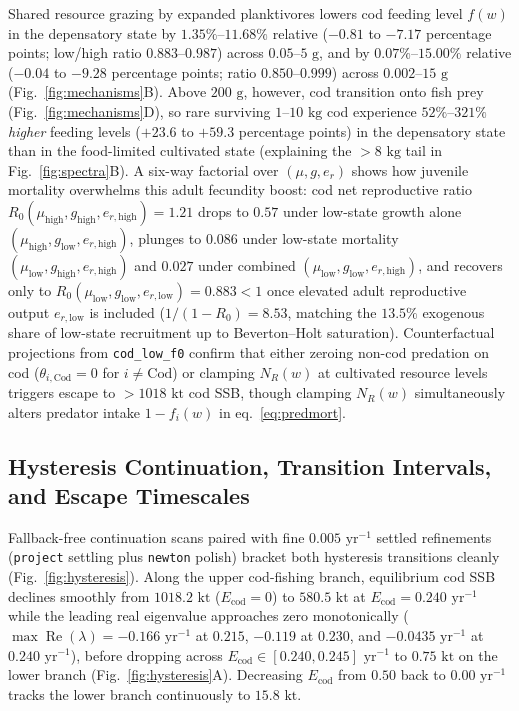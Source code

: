 \documentclass[11pt,letterpaper]{article}
\begin{document}
Shared resource grazing by expanded planktivores lowers cod feeding level $f(w)$ in the depensatory state by $1.35\%$--$11.68\%$ relative ($-0.81$ to $-7.17$ percentage points; low/high ratio $0.883$--$0.987$) across $0.05$--$5\text{ g}$, and by $0.07\%$--$15.00\%$ relative ($-0.04$ to $-9.28$ percentage points; ratio $0.850$--$0.999$) across $0.002$--$15\text{ g}$ (Fig.~\ref{fig:mechanisms}B). Above $200\text{ g}$, however, cod transition onto fish prey (Fig.~\ref{fig:mechanisms}D), so rare surviving $1$--$10\text{ kg}$ cod experience $52\%$--$321\%$ \emph{higher} feeding levels ($+23.6$ to $+59.3$ percentage points) in the depensatory state than in the food-limited cultivated state (explaining the $>8\text{ kg}$ tail in Fig.~\ref{fig:spectra}B). A six-way factorial over $(\mu, g, e_r)$ shows how juvenile mortality overwhelms this adult fecundity boost: cod net reproductive ratio $R_0(\mu_{\mathrm{high}}, g_{\mathrm{high}}, e_{r,\mathrm{high}}) = 1.21$ drops to $0.57$ under low-state growth alone $(\mu_{\mathrm{high}}, g_{\mathrm{low}}, e_{r,\mathrm{high}})$, plunges to $0.086$ under low-state mortality $(\mu_{\mathrm{low}}, g_{\mathrm{high}}, e_{r,\mathrm{high}})$ and $0.027$ under combined $(\mu_{\mathrm{low}}, g_{\mathrm{low}}, e_{r,\mathrm{high}})$, and recovers only to $R_0(\mu_{\mathrm{low}}, g_{\mathrm{low}}, e_{r,\mathrm{low}}) = 0.883 < 1$ once elevated adult reproductive output $e_{r,\mathrm{low}}$ is included ($1/(1 - R_0) = 8.53$, matching the $13.5\%$ exogenous share of low-state recruitment up to Beverton--Holt saturation). Counterfactual projections from \texttt{cod\_low\_f0} confirm that either zeroing non-cod predation on cod ($\theta_{i,\mathrm{Cod}} = 0$ for $i \neq \mathrm{Cod}$) or clamping $N_R(w)$ at cultivated resource levels triggers escape to $> 1018\text{ kt}$ cod SSB, though clamping $N_R(w)$ simultaneously alters predator intake $1 - f_i(w)$ in eq.~\eqref{eq:predmort}.

\subsection{Hysteresis Continuation, Transition Intervals, and Escape Timescales}

Fallback-free continuation scans paired with fine $0.005\text{ yr}^{-1}$ settled refinements (\texttt{project} settling plus \texttt{newton} polish) bracket both hysteresis transitions cleanly (Fig.~\ref{fig:hysteresis}). Along the upper cod-fishing branch, equilibrium cod SSB declines smoothly from $1018.2\text{ kt}$ ($E_{\mathrm{cod}} = 0$) to $580.5\text{ kt}$ at $E_{\mathrm{cod}} = 0.240\text{ yr}^{-1}$ while the leading real eigenvalue approaches zero monotonically ($\max\operatorname{Re}(\lambda) = -0.166\text{ yr}^{-1}$ at $0.215$, $-0.119$ at $0.230$, and $-0.0435\text{ yr}^{-1}$ at $0.240\text{ yr}^{-1}$), before dropping across $E_{\mathrm{cod}} \in [0.240, 0.245]\text{ yr}^{-1}$ to $0.75\text{ kt}$ on the lower branch (Fig.~\ref{fig:hysteresis}A). Decreasing $E_{\mathrm{cod}}$ from $0.50$ back to $0.00\text{ yr}^{-1}$ tracks the lower branch continuously to $15.8\text{ kt}$.
\end{document}
